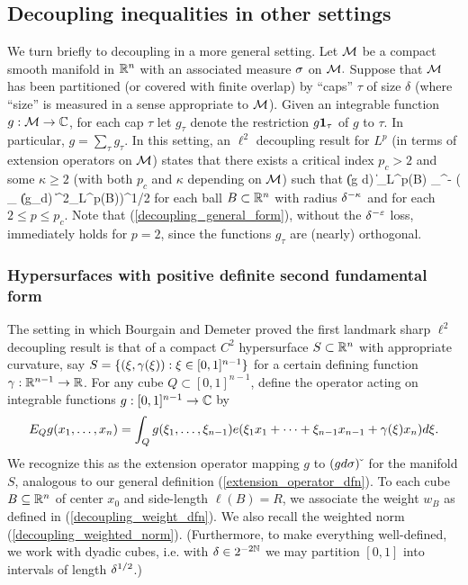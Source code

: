 \documentclass[brochure,english,12pt]{bourbaki}%
\newcommand{\C}{\mathbb{C}}
\begin{document}
\subsection{Decoupling inequalities in other settings}\label{sec_decoupling_other}
We turn briefly to decoupling in a more general setting.
Let $\mathcal{M}$ be a compact smooth manifold in $\mathbb{R}^n$ with an associated measure $\sigma$ on $\mathcal{M}.$ Suppose that $\mathcal{M}$ has been partitioned (or covered with finite overlap) by ``caps'' $\tau$ of size $\delta$ (where ``size'' is measured in a sense appropriate to $\mathcal{M}$). 
Given an integrable function $g : \Mcal \maps \C$, for each cap $\tau$ let $g_\tau$ denote the restriction $g \boldsymbol1_\tau$ of $g$ to $\tau$.
In particular, $g = \sum_{\tau} g_\tau$. 
In this setting, an $\ell^2$ decoupling result for $L^p$ (in terms of extension operators on $\mathcal{M}$) states that there exists a critical index $p_c>2$ and some $\kappa \geq 2$ (with both $p_c$ and $\kappa$ depending on $\mathcal{M}$) such that 
\beq\label{decoupling_general_form}
 \| (g d\sig)\check{\;} \|_{L^p(B)} \ll_\ep \del^{-\ep} ( \sum_{\tau} \| (g_\tau d\sig)\check{\;} \|^2_{L^p(B)})^{1/2} 
 \eeq
for each ball $B \subset \mathbb{R}^n$ with radius $\delta^{-\kappa}$ and for each $2 \leq p \leq p_c$. 
Note that (\ref{decoupling_general_form}), without the $\delta^{-\varepsilon}$ loss, immediately holds for $p=2$, since the functions $g_\tau$ are (nearly) orthogonal.









\subsubsection{Hypersurfaces with positive definite second fundamental form}
The setting in which Bourgain and Demeter proved the first landmark sharp $\ell^2$ decoupling result is that of a compact $C^2$ hypersurface $S \subset \mathbb{R}^n$ with appropriate curvature, say $S = \{ (\xi, \gamma(\xi)): \xi \in [0,1]^{n-1}\}$ for a certain defining function $\gamma : \mathbb{R}^{n-1} \rightarrow \mathbb{R}$. 
For any cube $Q \subset [0,1]^{n-1}$,  define the  operator acting on integrable functions $g: [0,1]^{n-1} \maps \C$ by
\[ E_Q g(x_1,\ldots, x_n)  = \int_Q g(\xi_1,\ldots, \xi_{n-1}) e(\xi_1 x_1 + \cdots + \xi_{n-1}x_{n-1} + \gamma(\xi) x_n) d\xi.\]
We recognize this as the extension operator mapping $g$ to $(g d\sigma ) \check{\;}$ for the manifold $S$, analogous to our general definition (\ref{extension_operator_dfn}).
To each cube $B \subseteq \mathbb{R}^n$ of center $x_0$ and side-length $\ell(B)=R$, we associate the weight $w_B$ as defined in (\ref{decoupling_weight_dfn}).
We also recall the weighted norm (\ref{decoupling_weighted_norm}). (Furthermore, to make everything well-defined, we work with dyadic cubes, i.e. with $\delta \in 2^{-2\mathbb{N}}$  we may partition $[0,1]$ into intervals of length $\delta^{1/2}$.)
\end{document}
